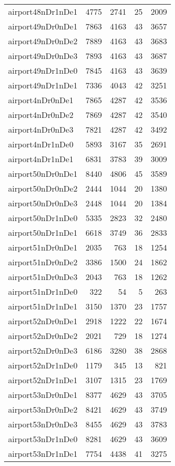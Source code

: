 \begin{longtable}{lrrrr}
airport48nDr1nDe1 & 4775 & 2741 & 25 & 2009 \\
airport49nDr0nDe1 & 7863 & 4163 & 43 & 3657 \\
airport49nDr0nDe2 & 7889 & 4163 & 43 & 3683 \\
airport49nDr0nDe3 & 7893 & 4163 & 43 & 3687 \\
airport49nDr1nDe0 & 7845 & 4163 & 43 & 3639 \\
airport49nDr1nDe1 & 7336 & 4043 & 42 & 3251 \\
airport4nDr0nDe1 & 7865 & 4287 & 42 & 3536 \\
airport4nDr0nDe2 & 7869 & 4287 & 42 & 3540 \\
airport4nDr0nDe3 & 7821 & 4287 & 42 & 3492 \\
airport4nDr1nDe0 & 5893 & 3167 & 35 & 2691 \\
airport4nDr1nDe1 & 6831 & 3783 & 39 & 3009 \\
airport50nDr0nDe1 & 8440 & 4806 & 45 & 3589 \\
airport50nDr0nDe2 & 2444 & 1044 & 20 & 1380 \\
airport50nDr0nDe3 & 2448 & 1044 & 20 & 1384 \\
airport50nDr1nDe0 & 5335 & 2823 & 32 & 2480 \\
airport50nDr1nDe1 & 6618 & 3749 & 36 & 2833 \\
airport51nDr0nDe1 & 2035 & 763 & 18 & 1254 \\
airport51nDr0nDe2 & 3386 & 1500 & 24 & 1862 \\
airport51nDr0nDe3 & 2043 & 763 & 18 & 1262 \\
airport51nDr1nDe0 & 322 & 54 & 5 & 263 \\
airport51nDr1nDe1 & 3150 & 1370 & 23 & 1757 \\
airport52nDr0nDe1 & 2918 & 1222 & 22 & 1674 \\
airport52nDr0nDe2 & 2021 & 729 & 18 & 1274 \\
airport52nDr0nDe3 & 6186 & 3280 & 38 & 2868 \\
airport52nDr1nDe0 & 1179 & 345 & 13 & 821 \\
airport52nDr1nDe1 & 3107 & 1315 & 23 & 1769 \\
airport53nDr0nDe1 & 8377 & 4629 & 43 & 3705 \\
airport53nDr0nDe2 & 8421 & 4629 & 43 & 3749 \\
airport53nDr0nDe3 & 8455 & 4629 & 43 & 3783 \\
airport53nDr1nDe0 & 8281 & 4629 & 43 & 3609 \\
airport53nDr1nDe1 & 7754 & 4438 & 41 & 3275 \\

\end{longtable}
